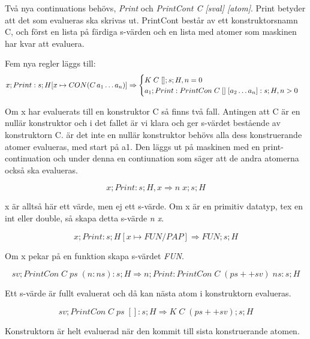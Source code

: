 \documentclass[../Core]{subfiles}
\begin{document}



Två nya continuations behövs, \emph{Print} och \emph{PrintCont C [sval] [atom]}.
Print betyder att det som evalueras ska skrivas ut. PrintCont består av ett
konstruktorsnamn C, och först en lista på färdiga s-värden och en lista med
atomer som maskinen har kvar att evaluera.

Fem nya regler läggs till:
\[
x ; Print : s ; H[x \mapsto CON(C\,a_1 \ldots a_n)]
\Rightarrow \begin{cases} 
K \; C \; [] ; s ; H , n = 0 \\
a_1 ; Print : PrintCon \; C \; [] \; [a_2 \ldots a_n] : s ; H , n > 0
\end{cases}
\]

Om x har evaluerats till en konstruktor C så finns två fall. Antingen att C är
en nullär konstruktor och i det fallet är vi klara och ger s-värdet bestående
av konstruktorn C.
    är det inte en nullär konstruktor behövs alla dess konstruerande atomer
evalueras, med start på a1. Den läggs ut på maskinen med en print-continuation
och under denna en contiunation som säger att de andra atomerna också ska
evalueras.
 

\[
x ; Print : s ; H , x
\Rightarrow n \; x ; s ; H
\]

x är alltså här ett värde, men ej ett s-värde.
Om x är en primitiv datatyp, tex en int eller double, så skapa detta s-värde
\emph{n x}.


\[
x ; Print : s ; H[x \mapsto FUN / PAP]
\Rightarrow FUN ; s ; H
\]

Om x pekar på en funktion skapa s-värdet \emph{FUN}.


\[
sv ; PrintCon \; C \; ps \; (n : ns) : s ; H
\Rightarrow n ; Print : PrintCon \; C \; (ps ++ sv) \; ns : s ; H
\]


Ett s-värde är fullt evaluerat och då kan nästa atom i konstruktorn evalueras. 


\[
sv ; PrintCon \; C \; ps \; [] : s ; H
\Rightarrow K \; C \; (ps ++ sv) ; s ; H
\]

Konstruktorn är helt evaluerad när den kommit till sista konstruerande atomen.
\end{document}
